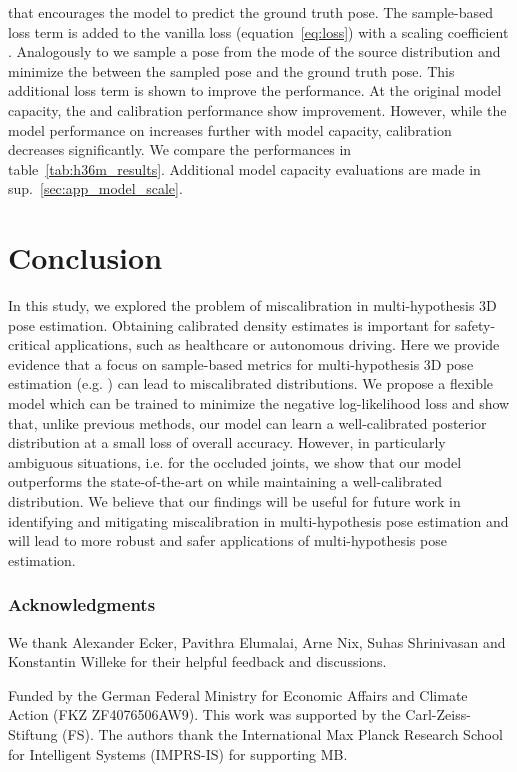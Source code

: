\documentclass{article} \usepackage{iclr2023_conference,times}
\def\eqref#1{equation~\ref{#1}}
\begin{document}
that encourages the model to predict the ground truth pose.
The sample-based loss term is added to the vanilla loss (\eqref{eq:loss}) with a scaling coefficient . Analogously to \citet{kolotouros2021} we sample a pose from the mode of the source distribution and minimize the  between the sampled pose and the ground truth pose.
This additional loss term is shown to improve the  performance. At the original model capacity, the  and calibration performance show improvement.
However, while the model performance on  increases further with model capacity, calibration decreases significantly.
We compare the performances in table~\ref{tab:h36m_results}.
Additional model capacity evaluations are made in sup.~\ref{sec:app_model_scale}.

\section{Conclusion}
    In this study, we explored the problem of miscalibration in multi-hypothesis 3D pose estimation.
    Obtaining calibrated density estimates is important for safety-critical applications, such as healthcare or autonomous driving.
    Here we provide evidence that a focus on sample-based metrics for multi-hypothesis 3D pose estimation (e.g. ) can lead to miscalibrated distributions.
    We propose a flexible model which can be trained to minimize the negative log-likelihood loss and
    show that, unlike previous methods, our model can learn a well-calibrated posterior distribution at a small loss of overall accuracy.
    However, in particularly ambiguous situations, i.e. for the occluded joints, we show that our model outperforms the state-of-the-art on  while maintaining a well-calibrated distribution.
    We believe that our findings will be useful for future work in identifying and mitigating miscalibration in multi-hypothesis pose estimation and will lead to more robust and safer applications of multi-hypothesis pose estimation.

\subsubsection*{Acknowledgments}
We thank Alexander Ecker, Pavithra Elumalai, Arne Nix, Suhas Shrinivasan and Konstantin Willeke for their helpful feedback and discussions.

Funded by the German Federal Ministry for Economic Affairs and Climate Action (FKZ ZF4076506AW9). This work was supported by the Carl-Zeiss-Stiftung (FS). The authors thank the International Max Planck Research School for Intelligent Systems (IMPRS-IS)
for supporting MB.
\end{document}
